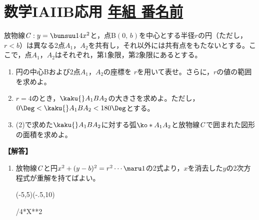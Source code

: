 \documentclass[b5j]{jarticle}
\def\Name#1{\section{\large\bf  #1\hfill
\underline{ \hspace{1zw}年\hspace{2zw}組\hspace{2zw}
番名前\hspace{12zw}}}}
\begin{document}
\Name{数学IAIIB応用}
\hakosyokika
\begin{caprm}
放物線${\it C}:y=\bunsuu14x^{2}$と，点B$(0,\,b)$を中心とする半径$r$の円（ただし，$r<b$）は異なる2点$A_{1}$，$A_{2}$を共有し，それ以外には共有点をもたないとする。ここで，点$A_{1}$，$A_{2}$はそれぞれ，第1象限，第2象限にあるとする。

\begin{enumerate}
\item 円の中心Bおよび2点$A_{1}$，$A_{2}$の座標を
$r$を用いて表せ。さらに，$r$の値の範囲を求めよ。

\item $r=4$のとき，$\kaku{}A_{1}BA_{2}$の大きさを求めよ。ただし，$0\Deg<\kaku{}A_{1}BA_{2}<180\Deg$とする。



\item (2)で求めた$\kaku{}A_{1}BA_{2}$に対する弧$\ko*{A_{1}A_{2}}$と放物線${\it C}$で囲まれた図形の面積を求めよ。

\end{enumerate}



\begin{multicols*}{2}
{\bf 【解答】}

\begin{enumerate}
\item 放物線${\it C}$と円$x^2+(y-b)^2=r^2\cdots\maru1$の2式より，$x$を消去した$y$の2次方程式が重解を持てばよい。

\begin{center}
\begin{zahyou}[haiti=t,ul=5mm,yokozikukigou={$x$},tatezikukigou={$y$},gentenhaiti={[sw]},yokozikuhaiti={[s]},tatezikuhaiti={[w]},yscale=1](-5,5)(-.5,10)
\def\Fx{1/4*X**2}

\YGurafu*\Fx
{}\xa
{}\xb


\Put{}
\Put{}

\En{}
\Hasen{\A\C}
\kuromaru{\B}








\end{zahyou}
\end{center}
\end{enumerate}
\end{multicols*}
\end{caprm}
\end{document}
